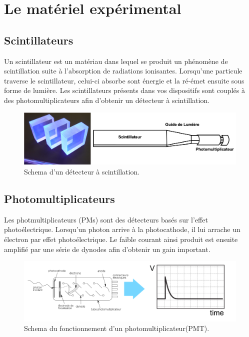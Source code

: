\section{Le matériel expérimental}

\subsection{Scintillateurs}

Un scintillateur est un matériau dans lequel se produit un phénomène de scintillation suite à l'absorption de radiations ionisantes. Lorsqu'une particule traverse le scintillateur, celui-ci absorbe sont énergie et la ré-émet ensuite sous forme de lumière. Les scintillateurs présents dans vos dispositifs sont couplés à des photomultiplicateurs afin d'obtenir un détecteur à scintillation. \\

\begin{figure}[!h]
    \centering
	\includegraphics[width=\textwidth]{figures/Scintillateur.png}
    \caption{Schema d'un détecteur à scintillation.}
    \label{fig:Scintillateur} 
\end{figure}

\subsection{Photomultiplicateurs}

Les photmultiplicateurs (PMs) sont des détecteurs basés sur l'effet photoélectrique. Lorsqu'un photon arrive à la photocathode, il lui arrache un électron par effet photoélectrique. Le faible courant ainsi produit est ensuite amplifié par une série de dynodes afin d'obtenir un gain important. \\

\begin{figure}[!h]
    \centering
	\includegraphics[width=\textwidth]{figures/PMT_readout.png}
    \caption{Schema du fonctionnement d'un photomultiplicateur(PMT).}
    \label{fig:PMT_readout} 
\end{figure}

